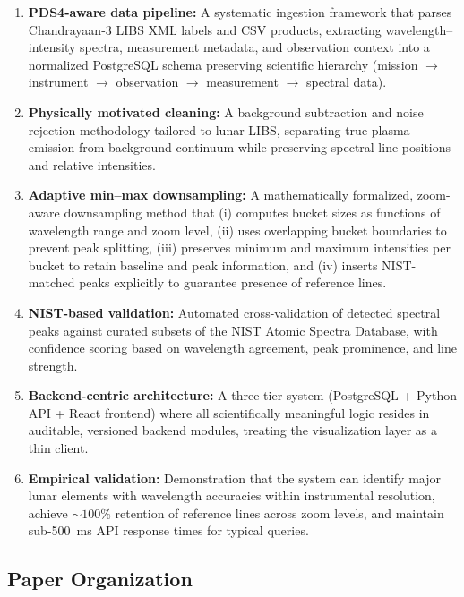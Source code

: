 \documentclass[12pt,a4paper]{article}
\begin{document}
\begin{enumerate}[label=(C\arabic*),leftmargin=2em]
  \item \textbf{PDS4-aware data pipeline:} A systematic ingestion framework that parses Chandrayaan-3 LIBS XML labels and CSV products, extracting wavelength--intensity spectra, measurement metadata, and observation context into a normalized PostgreSQL schema preserving scientific hierarchy (mission \(\rightarrow\) instrument \(\rightarrow\) observation \(\rightarrow\) measurement \(\rightarrow\) spectral data).
  \item \textbf{Physically motivated cleaning:} A background subtraction and noise rejection methodology tailored to lunar LIBS, separating true plasma emission from background continuum while preserving spectral line positions and relative intensities.
  \item \textbf{Adaptive min--max downsampling:} A mathematically formalized, zoom-aware downsampling method that (i) computes bucket sizes as functions of wavelength range and zoom level, (ii) uses overlapping bucket boundaries to prevent peak splitting, (iii) preserves minimum and maximum intensities per bucket to retain baseline and peak information, and (iv) inserts NIST-matched peaks explicitly to guarantee presence of reference lines.
  \item \textbf{NIST-based validation:} Automated cross-validation of detected spectral peaks against curated subsets of the NIST Atomic Spectra Database, with confidence scoring based on wavelength agreement, peak prominence, and line strength.
  \item \textbf{Backend-centric architecture:} A three-tier system (PostgreSQL + Python API + React frontend) where all scientifically meaningful logic resides in auditable, versioned backend modules, treating the visualization layer as a thin client.
  \item \textbf{Empirical validation:} Demonstration that the system can identify major lunar elements with wavelength accuracies within instrumental resolution, achieve \(\sim 100\%\) retention of reference lines across zoom levels, and maintain sub-\SI{500}{ms} API response times for typical queries.
\end{enumerate}

\subsection{Paper Organization}
\end{document}
